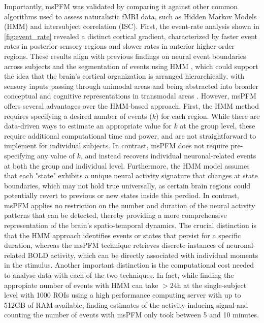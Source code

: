 Importantly, msPFM was validated by comparing it against other common algorithms
used to assess naturalistic fMRI data, such as Hidden Markov Models (HMM) and
intersubject correlation (ISC). First, the event-rate analysis shown in
\cref{fig:event_rate} revealed a distinct cortical gradient, characterized by
faster event rates in posterior sensory regions and slower rates in anterior
higher-order regions. These results align with previous findings on neural event
boundaries across subjects and the segmentation of events using HMM
\citep{Baldassano2017DiscoveringEventStructure,SavaSegal2022Individualvariabilityneural},
which could support the idea that the brain's cortical organization is arranged
hierarchically, with sensory inputs passing through unimodal areas and being
abstracted into broader conceptual and cognitive representations in transmodal
areas
\citep{Bernhardt2022Gradientsbrainorganization,Margulies2016Situatingdefaultmode,Samara2023Corticalgradientsnaturalistic}.
However, msPFM offers several advantages over the HMM-based approach. First, the
HMM method requires specifying a desired number of events ($k$) for
each region. While there are data-driven ways to estimate an appropriate value
for $k$ at the group level, these require additional computational time and
power, and are not straightforward to implement for individual subjects. In
contrast, msPFM does not require pre-specifying any value of $k$, and instead
recovers individual neuronal-related events at both the group and individual
level. Furthermore, the HMM model assumes that each "state" exhibits a unique
neural activity signature that changes at state boundaries, which may not hold
true universally, as certain brain regions could potentially revert to previous
or new states inside this perdiod. In contrast, msPFM applies no restriction on
the number and duration of the neural activity patterns that can be detected,
thereby providing a more comprehensive representation of the brain's
spatio-temporal dynamics. The crucial distinction is that the HMM approach
identifies events or states that persist for a specific duration, whereas the
msPFM technique retrieves discrete instances of neuronal-related BOLD activity,
which can be directly associated with individual moments in the stimulus.
Another important distinction is the computational cost needed to analyse data
with each of the two techniques. In fact, while finding the appropiate number of
events with HMM can take $>24$h at the single-subject level with 1000 ROIs using
a high performance computing server with up to 512GB of RAM available, finding
estimates of the activity-inducing signal and counting the number of events with
msPFM only took between 5 and 10 minutes.

